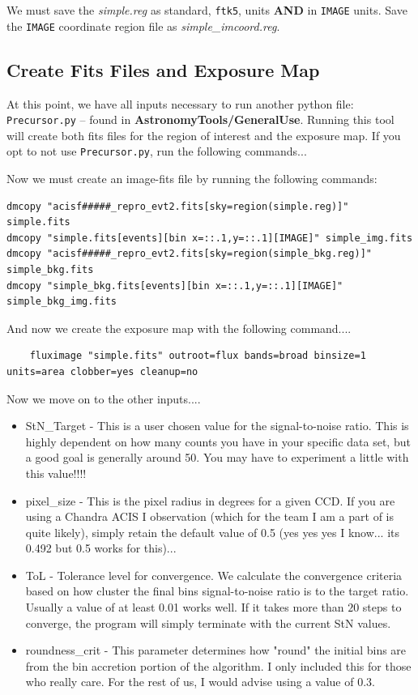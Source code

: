 \documentclass[11pt,letterpaper]{article}
\begin{document}
We must save the \textit{simple.reg} as standard, \texttt{ftk5}, units \textbf{AND} in \texttt{IMAGE} units. Save the \texttt{IMAGE} coordinate region file as \textit{simple\_imcoord.reg}.

\subsection{Create Fits Files and Exposure Map}

At this point, we have all inputs necessary to run another python file: \texttt{Precursor.py} -- found in \textbf{AstronomyTools/GeneralUse}. Running this tool will create both fits files for the region of interest and the exposure map. If you opt to not use \texttt{Precursor.py}, run the following commands...


Now we must create an image-fits file by running the following commands:
\begin{lstlisting}
dmcopy "acisf#####_repro_evt2.fits[sky=region(simple.reg)]" simple.fits
dmcopy "simple.fits[events][bin x=::.1,y=::.1][IMAGE]" simple_img.fits
dmcopy "acisf#####_repro_evt2.fits[sky=region(simple_bkg.reg)]" simple_bkg.fits
dmcopy "simple_bkg.fits[events][bin x=::.1,y=::.1][IMAGE]" simple_bkg_img.fits
\end{lstlisting}

And now we create the exposure map with the following command....

\begin{lstlisting}
	fluximage "simple.fits" outroot=flux bands=broad binsize=1 units=area clobber=yes cleanup=no
\end{lstlisting}

Now we move on to the other inputs....
\begin{itemize}
	\item StN\_Target - This is a user chosen value for the signal-to-noise ratio. This is highly dependent on how many counts you have in your specific data set, but a good goal is generally around 50. You may have to experiment a little with this value!!!!
	\item pixel\_size - This is the pixel radius in degrees for a given CCD. If you are using a Chandra ACIS I observation (which for the team I am a part of is quite likely), simply retain the default value of 0.5 (yes yes yes I know... its 0.492 but 0.5 works for this)...
	\item ToL - Tolerance level for convergence. We calculate the convergence criteria based on how cluster the final bins signal-to-noise ratio is to the target ratio. Usually a value of at least 0.01 works well. If it takes more than $20$ steps to converge, the program will simply terminate with the current StN values.
	\item roundness\_crit - This parameter determines how "round" the initial bins are from the bin accretion portion of the algorithm. I only included this for those who really care. For the rest of us, I would advise using a value of $0.3$.
\end{itemize}
\newpage
\end{document}
